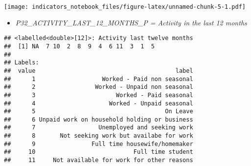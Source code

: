 \documentclass[
]{article}
\newenvironment{Shaded}{\begin{snugshade}}{\end{snugshade}}
\newcommand{\CommentTok}[1]{\textcolor[rgb]{0.56,0.35,0.01}{\textit{#1}}}
\newcommand{\FunctionTok}[1]{\textcolor[rgb]{0.13,0.29,0.53}{\textbf{#1}}}
\newcommand{\NormalTok}[1]{#1}
\newcommand{\SpecialCharTok}[1]{\textcolor[rgb]{0.81,0.36,0.00}{\textbf{#1}}}
\providecommand{\tightlist}{%
  \setlength{\itemsep}{0pt}\setlength{\parskip}{0pt}}
\begin{document}
\texttt{[image: indicators\_notebook\_files/figure-latex/unnamed-chunk-5-1.pdf]}

\begin{itemize}
\tightlist
\item
  \emph{P32\_ACTIVITY\_LAST\_12\_MONTHS\_P = Activity in the last 12
  months}
\end{itemize}

\begin{Shaded}
\end{Shaded}

\begin{verbatim}
## <labelled<double>[12]>: Activity last twelve months
##  [1] NA  7 10  2  8  9  4  6 11  3  1  5
## 
## Labels:
##  value                                        label
##      1                   Worked - Paid non seasonal
##      2                 Worked - Unpaid non seasonal
##      3                       Worked - Paid seasonal
##      4                     Worked - Unpaid seasonal
##      5                                     On Leave
##      6 Unpaid work on household holding or business
##      7                  Unemployed and seeking work
##      8       Not seeking work but availabe for work
##      9                Full time housewife/homemaker
##     10                            Full time student
##     11     Not available for work for other reasons
\end{verbatim}
\end{document}
